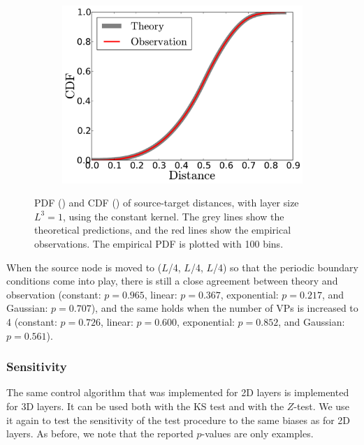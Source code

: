 \begin{figure}[t]
\begin{subfigure}[b]{0.49\textwidth}
    \includegraphics[width=\textwidth]{3D_constant_CDF.pdf}
    \label{subfig:res_3D_constant_CDF}
\end{subfigure}
\caption[Theoretical and empirical PDF and CDF of source-target distances using a constant kernel]{PDF () and CDF () of source-target distances, with layer size $L^3=1$, using the constant kernel. The grey lines show the theoretical predictions, and the red lines show the empirical observations. The empirical PDF is plotted with 100 bins.}
\label{fig:res_constant3D}
\end{figure}
When the source node is moved to ($L$/4, $L$/4, $L$/4) so that the periodic boundary conditions come into play, there is still a close agreement between theory and observation (constant: $p = 0.965$, linear: $p = 0.367$, exponential: $p = 0.217$, and Gaussian: $p = 0.707$), and the same holds when the number of VPs is increased to 4 (constant: $p = 0.726$, linear: $p = 0.600$, exponential: $p = 0.852$, and Gaussian: $p = 0.561$).



\subsubsection{Sensitivity}

The same control algorithm that was implemented for 2D layers is implemented for 3D layers. It can be used both with the KS test and with the $Z$-test. We use it again to test the sensitivity of the test procedure to the same biases as for 2D layers. As before, we note that the reported $p$-values are only examples. 

